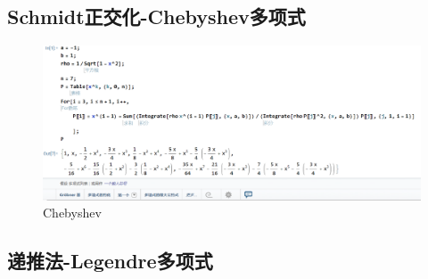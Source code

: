 \subsection{Schmidt正交化-Chebyshev多项式}

\begin{figure}[H]
	\centering
	\includegraphics[width = 1\linewidth]{day6/fig2.png}
	\caption{Chebyshev}
\end{figure}
\subsection{递推法-Legendre多项式}

